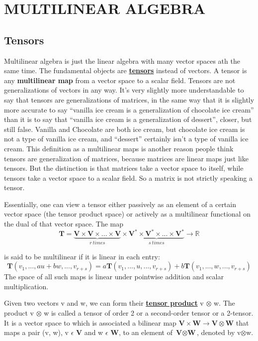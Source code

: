 \section{MULTILINEAR ALGEBRA}
\subsection{Tensors}
Multilinear algebra is just the linear algebra with many vector spaces ath the same time.
The fundamental objects are \href{https://www.quora.com/What-is-a-tensor}{\textbf{tensors}} instead of vectors.
A tensor is any \textbf{multilinear map} from a vector space to a scalar field.
Tensors are not generalizations of vectors in any way. It's very slightly more understandable to say that tensors are generalizations of matrices, 
in the same way that it is slightly more accurate to say “vanilla ice cream is a generalization of chocolate ice cream” 
than it is to say that “vanilla ice cream is a generalization of dessert”, closer, but still false. 
Vanilla and Chocolate are both ice cream, but chocolate ice cream is not a type of vanilla ice cream, and “dessert” certainly isn't a type of vanilla ice cream.
This definition as a multilinear maps is another reason people think tensors are generalization of matrices, because matrices are linear maps just like tensors. 
But the distinction is that matrices take a vector space to itself, while tensors take a vector space to a scalar field. 
So a matrix is not strictly speaking a tensor.

Essentially, one can view a tensor
either passively as an element of a certain vector space (the tensor product space)
or actively as a multilinear functional on the dual of that vector space. The map
\begin{equation}
    \textbf{T} = \underbrace{\textbf{V} \times \textbf{V} \times ... \times \textbf{V}}_{r \:times} \times \underbrace{\textbf{V}^* \times \textbf{V}^* \times ... \times \textbf{V}^*}_{s\: times} \rightarrow \mathbb{R} 
\end{equation}

is said to be multilinear if it is linear in each entry:
\begin{equation}
    \textbf{T} (v_1, . . . , au + bw, . . . , v_{r +s} ) = a\textbf{T} (v_1, . . . , u, . . . , v_{r +s} ) + b\textbf{T} (v_1, . . . , w, . . . , v_{r +s} )
\end{equation}
The space of all such maps is linear under pointwise addition and scalar
multiplication.

Given two vectors v and w, we can form their \href{http://web.math.ucsb.edu/~jhateley/project/tensor.pdf}{\textbf{tensor product}}
v $\otimes$ w. The product v $\otimes$ w is called a tensor of order 2 or a second-order tensor or a 2-tensor.
It is a vector space to which is associated a bilinear map $\textbf{V} \times \textbf{W} \rightarrow \textbf{V} \otimes \textbf{W}$
that maps a pair (v, w), v $\epsilon$ \textbf{V} and w $\epsilon$ \textbf{W}, to an element of $\textbf{V} \otimes \textbf{W}$, denoted by v$\otimes$w.

